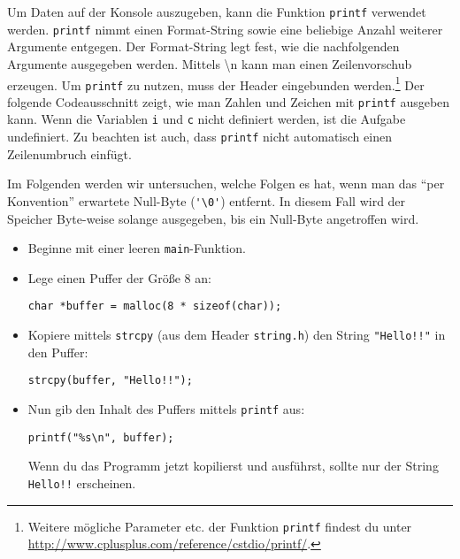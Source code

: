 Um Daten auf der Konsole auszugeben, kann die Funktion \lstinline{printf} verwendet werden.
\lstinline{printf} nimmt einen Format-String sowie eine beliebige Anzahl weiterer Argumente entgegen.
Der Format-String legt fest, wie die nachfolgenden Argumente ausgegeben werden.
Mittels \textbackslash n kann man einen Zeilenvorschub erzeugen. Um \lstinline{printf} zu nutzen, muss der Header  eingebunden werden.\footnote{Weitere mögliche Parameter etc. der Funktion \lstinline{printf} findest du unter \url{http://www.cplusplus.com/reference/cstdio/printf/}.}
Der folgende Codeausschnitt zeigt, wie man Zahlen und Zeichen mit \lstinline|printf| ausgeben kann.
Wenn die Variablen \lstinline|i| und \lstinline|c| nicht definiert werden, ist die Aufgabe undefiniert.
Zu beachten ist auch, dass \lstinline|printf| nicht automatisch einen Zeilenumbruch einfügt.
%

Im Folgenden werden wir untersuchen, welche Folgen es hat, wenn man das \enquote{per Konvention} erwartete Null-Byte (\lstinline|'\0'|) entfernt.
In diesem Fall wird der Speicher Byte-weise solange ausgegeben, bis ein Null-Byte angetroffen wird.
\begin{itemize}
\item 
Beginne mit einer leeren \lstinline|main|-Funktion.
\item 
Lege einen Puffer der Größe 8 an:
\begin{lstlisting}
char *buffer = malloc(8 * sizeof(char));
\end{lstlisting}
\item 
Kopiere mittels \lstinline|strcpy| (aus dem Header \lstinline|string.h|) den String \lstinline|"Hello!!"| in den Puffer:
\begin{lstlisting}
strcpy(buffer, "Hello!!");
\end{lstlisting}
\item 
Nun gib den Inhalt des Puffers mittels \lstinline|printf| aus:
\begin{lstlisting}
printf("%s\n", buffer);
\end{lstlisting}
Wenn du das Programm jetzt kopilierst und ausführst, sollte nur der String \lstinline|Hello!!| erscheinen.
\end{itemize}

